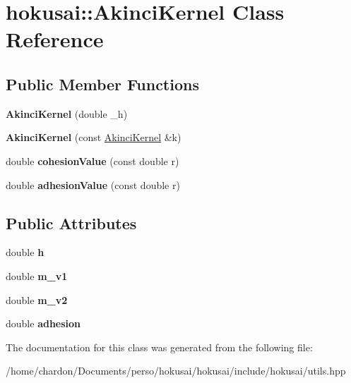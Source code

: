 \hypertarget{classhokusai_1_1AkinciKernel}{\section{hokusai\+:\+:Akinci\+Kernel Class Reference}
\label{classhokusai_1_1AkinciKernel}
}
\subsection*{Public Member Functions}
\begin{DoxyCompactItemize}
\item 
\hypertarget{classhokusai_1_1AkinciKernel_a41ff68de141ccf2080bf3239bdd6b32a}{{\bfseries Akinci\+Kernel} (double \+\_\+h)}\label{classhokusai_1_1AkinciKernel_a41ff68de141ccf2080bf3239bdd6b32a}

\item 
\hypertarget{classhokusai_1_1AkinciKernel_adb877318b11304c069d4417ad6d772f8}{{\bfseries Akinci\+Kernel} (const \hyperlink{classhokusai_1_1AkinciKernel}{Akinci\+Kernel} \&k)}\label{classhokusai_1_1AkinciKernel_adb877318b11304c069d4417ad6d772f8}

\item 
\hypertarget{classhokusai_1_1AkinciKernel_a2f682cba013d2eea8496c7848a0c6773}{double {\bfseries cohesion\+Value} (const double r)}\label{classhokusai_1_1AkinciKernel_a2f682cba013d2eea8496c7848a0c6773}

\item 
\hypertarget{classhokusai_1_1AkinciKernel_a643cd2b016849c284ad2d91c0c6c3adf}{double {\bfseries adhesion\+Value} (const double r)}\label{classhokusai_1_1AkinciKernel_a643cd2b016849c284ad2d91c0c6c3adf}

\end{DoxyCompactItemize}
\subsection*{Public Attributes}
\begin{DoxyCompactItemize}
\item 
\hypertarget{classhokusai_1_1AkinciKernel_a46f212a8527d05bbb28c4541498e4653}{double {\bfseries h}}\label{classhokusai_1_1AkinciKernel_a46f212a8527d05bbb28c4541498e4653}

\item 
\hypertarget{classhokusai_1_1AkinciKernel_a1e100355b68162e7c6d8bc4e33fada88}{double {\bfseries m\+\_\+v1}}\label{classhokusai_1_1AkinciKernel_a1e100355b68162e7c6d8bc4e33fada88}

\item 
\hypertarget{classhokusai_1_1AkinciKernel_a38c8e1a366886fbc8072b302d6998099}{double {\bfseries m\+\_\+v2}}\label{classhokusai_1_1AkinciKernel_a38c8e1a366886fbc8072b302d6998099}

\item 
\hypertarget{classhokusai_1_1AkinciKernel_a47f56e4ff7b75f5bedd064b456d836f8}{double {\bfseries adhesion}}\label{classhokusai_1_1AkinciKernel_a47f56e4ff7b75f5bedd064b456d836f8}

\end{DoxyCompactItemize}


The documentation for this class was generated from the following file\+:\begin{DoxyCompactItemize}
\item 
/home/chardon/\+Documents/perso/hokusai/hokusai/include/hokusai/utils.\+hpp\end{DoxyCompactItemize}
